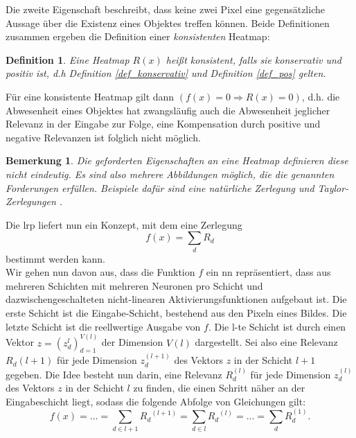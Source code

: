 \documentclass[11pt,a4paper]{article}
\def\emph#1{\textit{#1}}
\newtheorem{definition}[theorem]{Definition}
\newtheorem{remark}[theorem]{Bemerkung}
\numberwithin{equation}{section}
\begin{document}
	Die zweite Eigenschaft beschreibt, dass keine zwei Pixel eine gegensätzliche Aussage über die Existenz eines Objektes treffen können. Beide Definitionen zusammen ergeben die Definition einer \textit{konsistenten} Heatmap:
	
	\begin{definition}
		Eine Heatmap $R(x)$ heißt \emph{konsistent}, falls sie konservativ und positiv ist, d.h Definition \ref{def_konservativ} und Definition \ref{def_pos} gelten.
	\end{definition}
	
	Für eine konsistente Heatmap gilt dann $(f(x) = 0 \Rightarrow R(x) = 0)$, d.h. die Abwesenheit eines Objektes hat zwangsläufig auch die Abwesenheit jeglicher Relevanz in der Eingabe zur Folge, eine Kompensation durch positive und negative Relevanzen ist folglich nicht möglich.
	
	\begin{remark}
		Die geforderten Eigenschaften an eine Heatmap definieren diese nicht eindeutig. Es sind also mehrere Abbildungen möglich, die die genannten Forderungen erfüllen. Beispiele dafür sind eine natürliche Zerlegung und Taylor-Zerlegungen \cite{dtd_paper}.
	\end{remark}
	
	Die \gls{lrp} liefert nun ein Konzept, mit dem eine Zerlegung 
	\begin{equation}
	f(x) = \sum_dR_d
	\end{equation}
	bestimmt werden kann.\\
	
	
	
	Wir gehen nun davon aus, dass die Funktion $f$ ein \gls{nn} repräsentiert, dass aus mehreren Schichten mit mehreren Neuronen pro Schicht und dazwischengeschalteten nicht-linearen Aktivierungsfunktionen aufgebaut ist.
	Die erste Schicht ist die Eingabe-Schicht, bestehend aus den Pixeln eines Bildes. Die letzte Schicht ist die reellwertige Ausgabe von $f$. Die l-te Schicht ist durch einen Vektor $z = (z_d^{l})_{d=1}^{V(l)}$ der Dimension $V(l)$ dargestellt. Sei also eine Relevanz $R_d{(l+1)}$ für jede Dimension $z_d^{(l+1)}$ des Vektors $z$ in der Schicht $l+1$ gegeben. Die Idee besteht nun darin, eine Relevanz $R_d^{(l)}$ für jede Dimension $z_d^{(l)}$ des Vektors $z$ in der Schicht $l$ zu finden, die einen Schritt näher an der Eingabeschicht liegt, sodass die folgende Abfolge von Gleichungen gilt:
	\begin{equation}
	f(x) = ... = \sum_{d\in l+1}{R_d}^{(l+1)} = \sum_{d\in l}{R_d}^{(l)} = ... = \sum_d{R_d^{(1)}}.\label{erhaltungseigenschaft}
	\end{equation}
	
\end{document}
